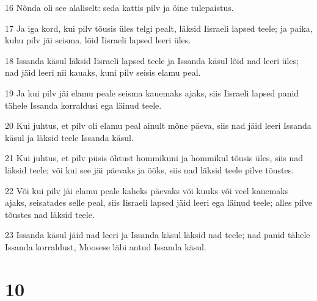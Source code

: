 \par 16 Nõnda oli see alaliselt: seda kattis pilv ja öine tulepaistus.
\par 17 Ja iga kord, kui pilv tõusis üles telgi pealt, läksid Iisraeli lapsed teele; ja paika, kuhu pilv jäi seisma, lõid Iisraeli lapsed leeri üles.
\par 18 Issanda käsul läksid Iisraeli lapsed teele ja Issanda käsul lõid nad leeri üles; nad jäid leeri nii kauaks, kuni pilv seisis elamu peal.
\par 19 Ja kui pilv jäi elamu peale seisma kauemaks ajaks, siis Iisraeli lapsed panid tähele Issanda korraldusi ega läinud teele.
\par 20 Kui juhtus, et pilv oli elamu peal ainult mõne päeva, siis nad jäid leeri Issanda käsul ja läksid teele Issanda käsul.
\par 21 Kui juhtus, et pilv püsis õhtust hommikuni ja hommikul tõusis üles, siis nad läksid teele; või kui see jäi päevaks ja ööks, siis nad läksid teele pilve tõustes.
\par 22 Või kui pilv jäi elamu peale kaheks päevaks või kuuks või veel kauemaks ajaks, seisatades selle peal, siis Iisraeli lapsed jäid leeri ega läinud teele; alles pilve tõustes nad läksid teele.
\par 23 Issanda käsul jäid nad leeri ja Issanda käsul läksid nad teele; nad panid tähele Issanda korraldust, Moosese läbi antud Issanda käsul.

\chapter{10}


